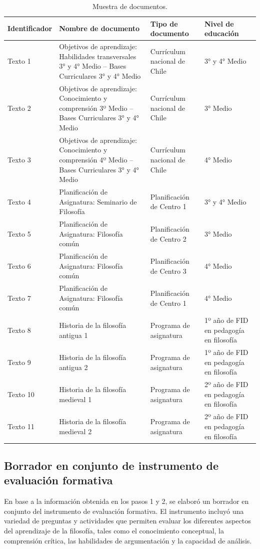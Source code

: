 \documentclass[spanish]{textolivre}
\begin{document}
\begin{table}[h!]
\centering
\caption{Muestra de documentos.}\label{tab-2}
\small
\begin{tabularx}{\textwidth}{lXlX}
\toprule
Identificador & Nombre de documento & Tipo de documento & Nivel de educación \\
\midrule
Texto 1 & Objetivos de aprendizaje: Habilidades transversales 3° y 4° Medio -- Bases Curriculares 3° y 4° Medio & Currículum nacional de Chile & 3° y 4° Medio \\
Texto 2 & Objetivos de aprendizaje: Conocimiento y comprensión 3º Medio -- Bases Curriculares 3° y 4° Medio & Currículum nacional de Chile & 3° Medio \\
Texto 3 & Objetivos de aprendizaje: Conocimiento y comprensión 4º Medio -- Bases Curriculares 3° y 4° Medio & Currículum nacional de Chile & 4° Medio \\
Texto 4 & Planificación de Asignatura: Seminario de Filosofía & Planificación de Centro 1 & 3° y 4° Medio \\
Texto 5 & Planificación de Asignatura: Filosofía común & Planificación de Centro 2 & 3° Medio \\
Texto 6 & Planificación de Asignatura: Filosofía común & Planificación de Centro 3 & 4° Medio \\
Texto 7 & Planificación de Asignatura: Filosofía común & Planificación de Centro 1 & 4° Medio \\
Texto 8 & Historia de la filosofía antigua 1 & Programa de asignatura & 1º año de FID en pedagogía en filosofía \\
Texto 9 & Historia de la filosofía antigua 2 & Programa de asignatura & 1º año de FID en pedagogía en filosofía \\
Texto 10 & Historia de la filosofía medieval 1 & Programa de asignatura & 2º año de FID en pedagogía en filosofía \\
Texto 11 & Historia de la filosofía medieval 2 & Programa de asignatura & 2º año de FID en pedagogía en filosofía \\
\bottomrule
\end{tabularx}
\end{table}

\subsection{Borrador en conjunto de instrumento de evaluación formativa}
En base a la información obtenida en los pasos 1 y 2, se elaboró un borrador en conjunto del instrumento de evaluación formativa. El instrumento incluyó una variedad de preguntas y actividades que permiten evaluar los diferentes aspectos del aprendizaje de la filosofía, tales como el conocimiento conceptual, la comprensión crítica, las habilidades de argumentación y la capacidad de análisis. 
\end{document}
